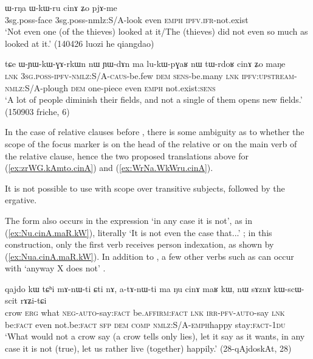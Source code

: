 \begin{exe}
\ex \label{ex:WrNa.WkWru.cinA}
\gll ɯ-rŋa ɯ-kɯ-ru cinɤ ʑo pjɤ-me \\
3sg.poss-face 3sg.poss-nmlz:S/A-look even \textsc{emph} \textsc{ipfv}.\textsc{ifr}-not.exist \\
\glt `Not even one (of the thieves) looked at it/The (thieves) did not even so much as looked at it.' (140426 luozi he qiangdao)
\end{exe}

\begin{exe}
\ex \label{ex:lukWpGaR.nW.cinA}
\gll tɕe ɯ-ɲɯ-kɯ-ɣɤ-rkɯn nɯ ɲɯ-dɤn ma lu-kɯ-pɣaʁ nɯ tɯ-rdoʁ cinɤ ʑo maŋe \\
\textsc{lnk} \textsc{3sg}.\textsc{poss}-\textsc{ipfv}-\textsc{nmlz}:S/A-\textsc{caus}-be.few \textsc{dem} \textsc{sens}-be.many \textsc{lnk} \textsc{ipfv}:\textsc{upstream}-\textsc{nmlz}:S/A-plough \textsc{dem} one-piece even \textsc{emph} not.exist:\textsc{sens} \\
\glt `A lot of people diminish their fields, and not a single of them opens new fields.' (150903 friche, 6)
\end{exe}

In the case of relative clauses before , there is some ambiguity as to whether the scope of the focus marker is on the head of the relative or on the main verb of the relative clause, hence the two proposed translations above for (\ref{ex:zrWG.kAmto.cinA}) and (\ref{ex:WrNa.WkWru.cinA}).

It is not possible to use  with scope over transitive subjects, followed by the ergative.

The form  also occurs in the expression  `in any case it is not', as in (\ref{ex:Nu.cinA.maR.kW}), literally `It is not even the case that...' ; in this construction, only the first verb  receives person indexation, as shown by (\ref{ex:Nua.cinA.maR.kW}). In addition to , a few other verbs such as  can occur with  `anyway X does not' .

 \begin{exe}
\ex \label{ex:Nu.cinA.maR.kW}
\gll qajdo kɯ tɕʰi mɤ-nɯ-ti ɕti nɤ, a-tɤ-nɯ-ti ma ŋu cinɤ maʁ kɯ, nɯ sɤznɤ kɯ-scɯ-scit rɤʑi-tɕi \\
crow \textsc{erg} what \textsc{neg}-\textsc{auto}-say:\textsc{fact} be.\textsc{affirm}:\textsc{fact} \textsc{lnk} \textsc{irr}-\textsc{pfv}-\textsc{auto}-say \textsc{lnk} be:\textsc{fact} even not.be:\textsc{fact} \textsc{sfp} \textsc{dem} \textsc{comp} \textsc{nmlz}:S/A-\textsc{emph}\redp{}happy stay:\textsc{fact}-\textsc{1du} \\
\glt `What would not a crow say (a crow tells only lies), let it say as it wants, in any case it is not (true), let us rather live (together) happily.' (28-qAjdoskAt, 28)
\end{exe} 

